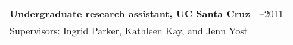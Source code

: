 \documentclass[letterpaper,11pt,oneside]{article}
\begin{document}
\noindent \begin{tabular}{@{} >{\raggedright\arraybackslash}p{14.41cm} >{\raggedleft\arraybackslash}p{1.7cm}}
 \textbf{Undergraduate research assistant, UC Santa Cruz} & 2010--2011 \\
 \hspace{5mm}Supervisors: Ingrid Parker, Kathleen Kay, and Jenn Yost & \\
\end{tabular}
\bigskip
\bigskip





\end{document}
